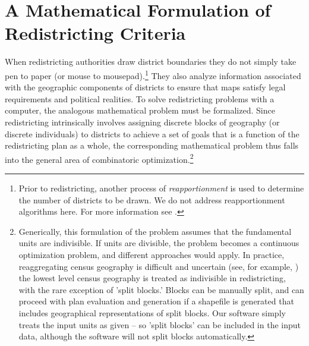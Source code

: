 \documentclass[article]{JSSstyle/jss}
\begin{document}
\section{A Mathematical Formulation of Redistricting Criteria}

When redistricting authorities draw district boundaries they do not 
simply take pen to paper (or mouse to mousepad).\footnote{Prior to redistricting, another process of \emph{reapportionment} is used to determine the number of districts to be drawn. We do not address reapportionment algorithms here. For more information see \citet{BalYoung01}.}  They also analyze information associated with the geographic 
components of districts to ensure that maps satisfy legal requirements and political realities. 
To solve redistricting problems with a computer, the analogous mathematical problem must be formalized.  Since redistricting 
intrinsically involves assigning discrete blocks of geography (or 
discrete individuals) to districts to achieve a set of goals that is a function 
of the redistricting plan as a whole, the corresponding mathematical 
problem thus falls into the general area of combinatoric optimization.\footnote{Generically, this formulation of the problem assumes that the fundamental units are indivisible. If units are divisible, the problem becomes a continuous optimization problem, and different approaches would apply. In practice, reaggregating census geography is difficult and uncertain (see, for example, \citet{ROAD}) the lowest level census geography is treated as indivisible in redistricting, with the rare exception of 'split blocks.' Blocks can be manually split, and  can proceed with plan evaluation and generation if a shapefile is generated that includes geographical representations of split blocks. Our software simply treats the input units as given -- so 'split blocks' can be included in the input data, although the software will not split blocks automatically.}
\end{document}
